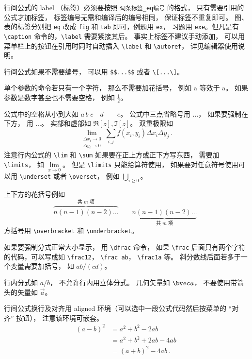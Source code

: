 行间公式的 label （标签）必须要按照 \verb|词条标签_eq编号| 的格式， 只有需要引用的公式才加标签， 标签编号无需和编译后的编号相同， 保证标签不重复即可。 图、表的标签分别把 \verb|eq| 改成 \verb|fig| 和 \verb|tab| 即可，例题用 \verb|ex|， 习题用 \verb|exe|。但凡是有 \verb|\caption| 命令的，\verb|\label| 需要紧接其后。 事实上标签不建议手动添加， 可以用菜单栏上的按钮在引用时同时自动插入 \verb|\label| 和 \verb|\autoref|， 详见编辑器使用说明。

行间公式如果不需要编号， 可以用 \verb|$$...$$| 或者 \verb|\[...\]|。


单个参数的命令若只有一个字符， 那么不需要加花括号， 例如 $\mathrm a$ 等效于 $\mathrm{a}$。 如果参数是数字甚至也不需要空格， 例如 $\frac12$。

公式中的空格从小到大如 $a\, b\; c\quad d\qquad e$。 公式中三点省略号用 $\dots$， 如果要强制在下方， 用 $\ldots$。 实部和虚部如 $\Re[z], \Im[z]$。 双重极限如
\begin{equation}
\lim_{\substack{\Delta x_i\to 0\\ \Delta y_i\to 0}} \sum_{i, j} f(x_i,y_i) \Delta x_i \Delta y_j~.
\end{equation}
注意行内公式的 \verb|\lim| 和 \verb|\sum| 如果要在正上方或正下方写东西， 需要加 \verb|\limits|， 如 $\lim\limits_{x\to 0}$。 但是 \verb|\limits| 只能给算符使用， 如果要对任意符号使用可以用 \verb|\underset| 或者 \verb|\overset|， 例如 $\underset{i \ge 0}{\bigcup}$。

上下方的花括号例如
\begin{equation}
\overbrace{n(n-1)(n-2)\dots}^{\text{共 $m$ 项}} \qquad \underbrace{n(n-1)(n-2)\dots}_{\text{共 $m$ 项}}~
\end{equation}
方括号用 \verb|\overbracket| 和 \verb|\underbracket|。

如果要强制分式正常大小显示， 用 \verb|\dfrac| 命令， 如果 \verb|\frac| 后面只有两个字符的代码，可以写成如 \verb|\frac12|， \verb|\frac ab|， \verb|\frac1a| 等。 斜分数线后面若多于一个变量需要加括号， 如 $ab/(cd)$。

行内分式如 $a/b$， 不允许行内用立体分式。 几何矢量如 $\bvec a$， 不要使用带箭头的矢量如 $\vec a$。 

行间公式换行及对齐用 aligned 环境（可以选中一段公式代码然后按菜单的 “对齐” 按钮）， 注意该环境可嵌套。
\begin{equation}
\begin{aligned}
(a-b)^2 &= a^2+b^2 - 2ab \\
& = a^2+b^2+2ab-4ab\\
& = (a+b)^2-4ab~.
\end{aligned}
\end{equation}

